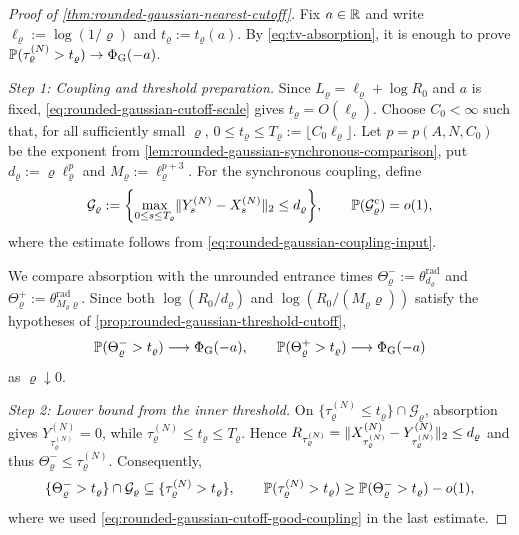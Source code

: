 \documentclass[11pt,reqno,a4paper]{article}
\newcommand{\Pp}{\P}
\begin{document}
\begin{proof}[Proof of \cref{thm:rounded-gaussian-nearest-cutoff}]
  Fix $a\in\mathbb{R}$ and write $\ell_\varrho:=\log(1/\varrho)$ and
  $t_\varrho:=t_\varrho(a)$. By \cref{eq:tv-absorption}, it is enough to prove
  $\Pp(\tau_\varrho^{(N)}>t_\varrho)\to\Phi_{\mathrm G}(-a)$.

  \emph{Step 1: Coupling and threshold preparation.}
  Since $L_\varrho=\ell_\varrho+\log R_0$ and $a$ is fixed,
  \cref{eq:rounded-gaussian-cutoff-scale} gives
  $t_\varrho=O(\ell_\varrho)$. Choose $C_0<\infty$ such that, for all
  sufficiently small $\varrho$, $0\leq t_\varrho\leq
  T_\varrho:=\lfloor C_0\ell_\varrho\rfloor$. Let
  $p=p(A,N,C_0)$ be the exponent from
  \cref{lem:rounded-gaussian-synchronous-comparison}, put
  $d_\varrho:=\varrho\ell_\varrho^p$ and
  $M_\varrho:=\ell_\varrho^{p+3}$. For the synchronous coupling, define
  \begin{equation}\label{eq:rounded-gaussian-cutoff-good-coupling}
    \mathcal G_\varrho
    :=
    \left\{
      \max_{0\leq s\leq T_\varrho}
      \norm{Y_s^{(N)}-X_s^{(N)}}_2
      \leq d_\varrho
    \right\},
    \qquad
    \Pp(\mathcal G_\varrho^{\mathrm c})=o(1),
  \end{equation}
  where the estimate follows from
  \cref{eq:rounded-gaussian-coupling-input}.

  We compare absorption with the unrounded entrance times
  $\Theta_\varrho^-:=\theta_{d_\varrho}^{\mathrm{rad}}$ and
  $\Theta_\varrho^+:=\theta_{M_\varrho\varrho}^{\mathrm{rad}}$.
  Since both $\log(R_0/d_\varrho)$ and
  $\log(R_0/(M_\varrho\varrho))$ satisfy the hypotheses of
  \cref{prop:rounded-gaussian-threshold-cutoff},
  \begin{equation}\label{eq:rounded-gaussian-cutoff-thresholds}
    \Pp(\Theta_\varrho^->t_\varrho)
    \longrightarrow\Phi_{\mathrm G}(-a),
    \qquad
    \Pp(\Theta_\varrho^+>t_\varrho)
    \longrightarrow\Phi_{\mathrm G}(-a)
  \end{equation}
  as $\varrho\downarrow0$.

  \emph{Step 2: Lower bound from the inner threshold.}
  On $\{\tau_\varrho^{(N)}\leq t_\varrho\}\cap\mathcal G_\varrho$,
  absorption gives $Y_{\tau_\varrho^{(N)}}^{(N)}=0$, while
  $\tau_\varrho^{(N)}\leq t_\varrho\leq T_\varrho$. Hence
  $R_{\tau_\varrho^{(N)}}=
  \lVert X_{\tau_\varrho^{(N)}}^{(N)}-
  Y_{\tau_\varrho^{(N)}}^{(N)}\rVert_2\leq d_\varrho$ and thus
  $\Theta_\varrho^-\leq\tau_\varrho^{(N)}$. Consequently,
  \begin{equation}\label{eq:rounded-gaussian-cutoff-lower-bound}
    \{\Theta_\varrho^->t_\varrho\}\cap\mathcal G_\varrho
    \subseteq\{\tau_\varrho^{(N)}>t_\varrho\},
    \qquad
    \Pp(\tau_\varrho^{(N)}>t_\varrho)
    \geq\Pp(\Theta_\varrho^->t_\varrho)-o(1),
  \end{equation}
  where we used
  \cref{eq:rounded-gaussian-cutoff-good-coupling} in the last estimate.


\end{proof}
\end{document}

